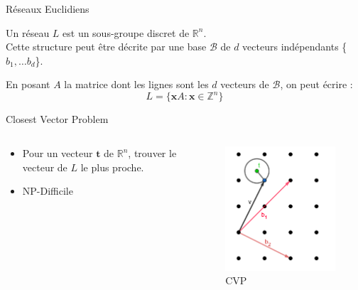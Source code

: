 \documentclass{backend/backend}
\begin{document}
\begin{frame}{Réseaux Euclidiens}
    
    
    Un réseau $L$ est un sous-groupe discret de $\mathbb{R}^n$.\\
    
    Cette structure peut être décrite par une base $\mathcal{B}$ de $d$ vecteurs indépendants \{$b_1, \dots b_d$\}.
    
    
    En posant $A$ la matrice dont les lignes sont les $d$ vecteurs de $\mathcal{B}$, on peut écrire :
    $$L = \{\mathbf{x}A : \mathbf{x} \in \mathbb{Z}^n\}$$
\end{frame}



\begin{frame}{Closest Vector Problem}

\begin{columns}

    \begin{column}{0.5 \linewidth}
        \begin{itemize}
            \item Pour un vecteur $\mathbf{t}$ de $\mathbb{R}^n$, trouver le vecteur de $L$ le plus proche.
            \item NP-Difficile
        \end{itemize}
    \end{column}

    \begin{column}{0.5 \linewidth}
        \begin{figure}
            \centering
            \includegraphics[width=0.5\linewidth]{img/reseaux/The-closest-vector-problem.png}
            \caption{CVP \cite{CVP_illustration}}
            \label{fig:CVP}
        \end{figure}
    \end{column}


\end{columns}

\end{frame}
\end{document}
